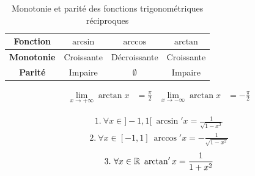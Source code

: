 \begin{figure}[h!]
	\centering
\end{figure}


\begin{table}[h!]
	\centering
	\begin{tabular}{c c c c}
		\textbf{Fonction}& $\arcsin$ & $\arccos$ & $\arctan$ \\
		\hline
		\textbf{Monotonie} & Croissante & Décroissante & Croissante \\
		\textbf{Parité} & Impaire & $\emptyset$ & Impaire \\
		\hline
	\end{tabular}
	\caption{Monotonie et parité des fonctions trigonométriques réciproques}
\end{table}    

\begin{graybox}
	\begin{proposition}
		\begin{align*}
			\lim_{x \to +\infty}{\arctan{x}} &= \frac{\pi}{2} & \lim_{x \to -\infty}{\arctan{x}} &= -\frac{\pi}{2}
		\end{align*}
	\end{proposition}
\end{graybox}

\begin{graybox}
	\begin{proposition}[Dérivées]
		\begin{align*}
			1.\ \forall x \in ]-1, 1[ \ \arcsin'{x} = \frac{1}{\sqrt{1 - x^2}} 
		\end{align*}
		\begin{align*}
			2. \ \forall x \in [-1, 1] \ \arccos'{x} = - \frac{1}{\sqrt{1 - x^2}} 
		\end{align*}
		\begin{align*}
			3. \ \forall x \in \mathbb{R} \ \arctan'{x} = \frac{1}{1 + x^2}
		\end{align*}
	\end{proposition}
\end{graybox}

